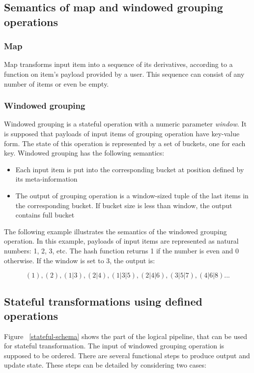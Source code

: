 \subsection{Semantics of map and windowed grouping operations}

\subsubsection{Map}
Map transforms input item into a sequence of its derivatives, according to a function on item's payload provided by a user. This sequence can consist of any number of items or even be empty.

\subsubsection{Windowed grouping}
Windowed grouping is a stateful operation with a numeric parameter {\it window}. It is supposed that payloads of input items of grouping operation have key-value form. The state of this operation is represented by a set of buckets, one for each key. Windowed grouping has the following semantics:

\begin{itemize}
    \item Each input item is put into the corresponding bucket at position defined by its meta-information
    \item The output of grouping operation is a window-sized tuple of the last items in the corresponding bucket. If bucket size is less than window, the output contains full bucket
\end{itemize}

The following example illustrates the semantics of the windowed grouping operation. In this example, payloads of input items are represented as natural numbers: 1, 2, 3, etc. The hash function returns 1 if the number is even and 0 otherwise. If the window is set to 3, the output is:

\[(1), (2), (1|3), (2|4), (1|3|5), (2|4|6), (3|5|7), (4|6|8)...\]

\subsection{Stateful transformations using defined operations}
Figure ~\ref{stateful-schema} shows the part of the logical pipeline, that can be used for stateful transformation. The input of windowed grouping operation is supposed to be ordered. There are several functional steps to produce output and update state. These steps can be detailed by considering two cases:

